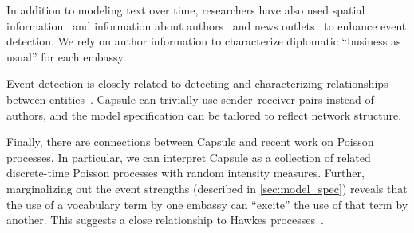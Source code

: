 In addition to modeling text over time, researchers have also used
spatial
information~\cite{Neill:2005,mathioudakis2010identifying,liu2011using}
and information about authors~\cite{zhao2007temporal} and news
outlets~\cite{wang2007mining} to enhance event detection. We rely on
author information to characterize diplomatic ``business as usual''
for each embassy.

Event detection is closely related to detecting and characterizing
relationships between
entities~\cite{schein2015bayesian,linderman2014discovering,das2011dynamic}. Capsule
can trivially use sender--receiver pairs instead of authors, and the
model specification can be tailored to reflect network structure.

Finally, there are connections between Capsule and recent work on
Poisson processes. In particular, we can interpret Capsule as a
collection of related discrete-time Poisson processes with random
intensity measures. Further, marginalizing out the event strengths
(described in \cref{sec:model_spec}) reveals that the use of a
vocabulary term by one embassy can ``excite'' the use of that term by
another. This suggests a close relationship to Hawkes
processes~\cite{hawkes1971spectra}.


